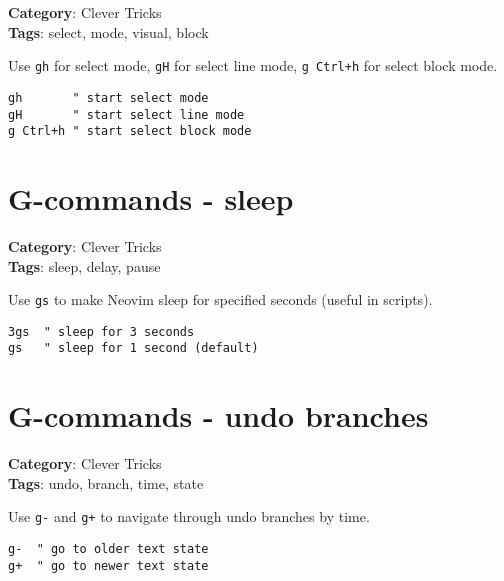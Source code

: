 {{\textbf{Category}: Clever Tricks\\ \textbf{Tags}: select, mode, visual, block
\vspace{0.5cm}

Use {\footnotesize \Verb§gh§} for select mode, {\footnotesize \Verb§gH§} for select line mode, {\footnotesize \Verb§g Ctrl+h§} for select block mode.

\begin{Exa*}{}
\begin{Verbatim}[fontsize=\footnotesize, breaklines, breakanywhere]
gh       " start select mode
gH       " start select line mode
g Ctrl+h " start select block mode
\end{Verbatim}
\end{Exa*}

\section{G-commands - sleep}

\textbf{Category}: Clever Tricks\\ \textbf{Tags}: sleep, delay, pause
\vspace{0.5cm}

Use {\footnotesize \Verb§gs§} to make Neovim sleep for specified seconds (useful in scripts).

\begin{Exa*}{}
\begin{Verbatim}[fontsize=\footnotesize, breaklines, breakanywhere]
3gs  " sleep for 3 seconds
gs   " sleep for 1 second (default)
\end{Verbatim}
\end{Exa*}

\section{G-commands - undo branches}

\textbf{Category}: Clever Tricks\\ \textbf{Tags}: undo, branch, time, state
\vspace{0.5cm}

Use {\footnotesize \Verb§g-§} and {\footnotesize \Verb§g+§} to navigate through undo branches by time.

\begin{Exa*}{}
\begin{Verbatim}[fontsize=\footnotesize, breaklines, breakanywhere]
g-  " go to older text state
g+  " go to newer text state
\end{Verbatim}
\end{Exa*}

}}
